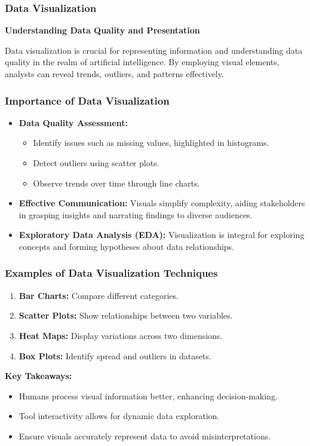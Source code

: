 \documentclass[aspectratio=169]{beamer}
\begin{document}
\begin{frame}[fragile]
    \frametitle{Data Visualization}
    
    \textbf{Understanding Data Quality and Presentation}

    Data visualization is crucial for representing information and understanding data quality in the realm of artificial intelligence. By employing visual elements, analysts can reveal trends, outliers, and patterns effectively.
\end{frame}

\begin{frame}[fragile]
    \frametitle{Importance of Data Visualization}

    \begin{itemize}
        \item \textbf{Data Quality Assessment:}
        \begin{itemize}
            \item Identify issues such as missing values, highlighted in histograms.
            \item Detect outliers using scatter plots.
            \item Observe trends over time through line charts.
        \end{itemize}
        
        \item \textbf{Effective Communication:}
        Visuals simplify complexity, aiding stakeholders in grasping insights and narrating findings to diverse audiences.
        
        \item \textbf{Exploratory Data Analysis (EDA):}
        Visualization is integral for exploring concepts and forming hypotheses about data relationships.
    \end{itemize}
\end{frame}

\begin{frame}[fragile]
    \frametitle{Examples of Data Visualization Techniques}

    \begin{enumerate}
        \item \textbf{Bar Charts:} Compare different categories.
        \item \textbf{Scatter Plots:} Show relationships between two variables.
        \item \textbf{Heat Maps:} Display variations across two dimensions.
        \item \textbf{Box Plots:} Identify spread and outliers in datasets.
    \end{enumerate}

    \textbf{Key Takeaways:}
    \begin{itemize}
        \item Humans process visual information better, enhancing decision-making.
        \item Tool interactivity allows for dynamic data exploration.
        \item Ensure visuals accurately represent data to avoid misinterpretations.
    \end{itemize}
\end{frame}
\end{document}
